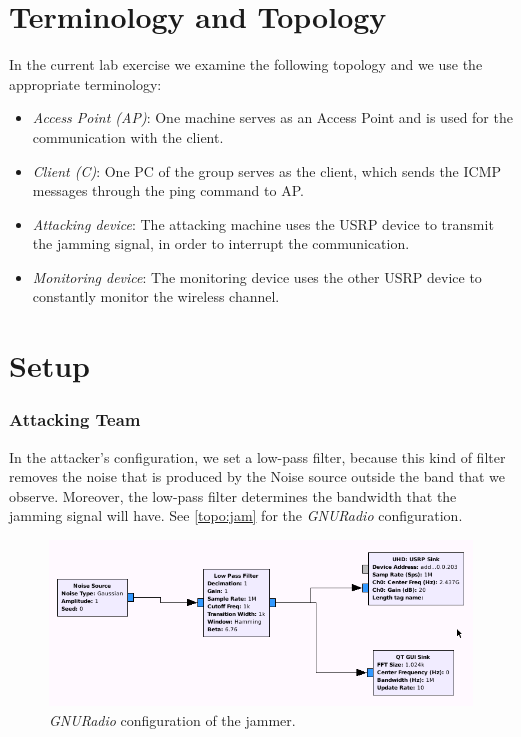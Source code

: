 \documentclass[12pt,a4paper]{article}
\begin{document}
\section{Terminology and Topology}
In the current lab exercise we examine the following topology and we use the appropriate terminology:
\begin{itemize}
\item \emph{Access Point (AP)}: One machine serves as an Access Point and is used for the communication with the client.
\item \emph{Client (C)}: One PC of the group serves as the client, which sends the ICMP messages through the ping command to AP.
\item \emph{Attacking device}: The attacking machine uses the USRP device to transmit the jamming signal, in order to interrupt the communication.
\item \emph{Monitoring device}: The monitoring device uses the other USRP device to constantly monitor the wireless channel.
\end{itemize}



\section{Setup}
	\subsubsection{Attacking Team}
		In the attacker's configuration, we set a low-pass filter, because this kind of filter removes the noise that is produced by the Noise source outside the band that we observe. Moreover, the low-pass filter determines the bandwidth that the jamming signal will have.
		See \autoref{topo:jam} for the \emph{GNURadio} configuration.
		\begin{figure}
			\includegraphics[width=\textwidth]{images/topo1.png}
			\caption{\emph{GNURadio} configuration of the jammer.}
			\label{topo:jam}
		\end{figure}
		
\end{document}
